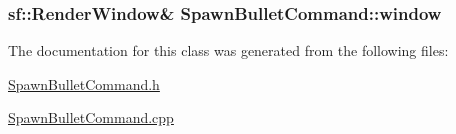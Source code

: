 \subsubsection[{window}]{\setlength{\rightskip}{0pt plus 5cm}sf\+::\+Render\+Window\& Spawn\+Bullet\+Command\+::window\hspace{0.3cm}{\ttfamily [private]}}\label{class_spawn_bullet_command_a5d0554f50bb223ed223319884b8c0e39}


The documentation for this class was generated from the following files\+:\begin{DoxyCompactItemize}
\item 
\hyperlink{_spawn_bullet_command_8h}{Spawn\+Bullet\+Command.\+h}\item 
\hyperlink{_spawn_bullet_command_8cpp}{Spawn\+Bullet\+Command.\+cpp}\end{DoxyCompactItemize}
